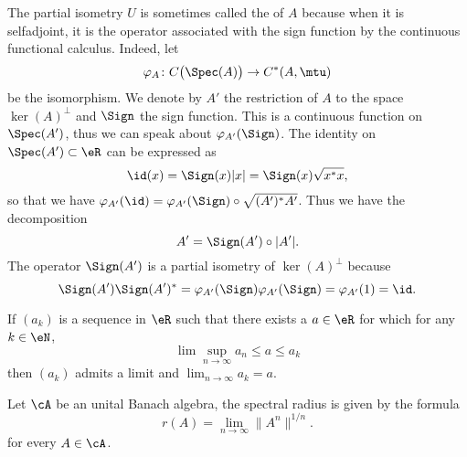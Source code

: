 The partial isometry $U$ is sometimes called the  of $A$ because when it is selfadjoint, it is the operator associated with the sign function by the continuous functional calculus. Indeed, let 
\begin{equation}
	\varphi_A\colon C\big( \Spec(A) \big)\to C^*(A,\mtu)
\end{equation}
be the isomorphism. We denote by $A'$ the restriction of $A$ to the space $\ker(A)^{\perp}$ and $\Sign$ the sign function. This is a continuous function on $\Spec(A')$, thus we can speak about $\varphi_{A'}(\Sign)$. The identity on $\Spec(A')\subset\eR$ can be expressed as
\begin{equation}
	\id(x)=\Sign(x)| x |=\Sign(x)\sqrt{x^*x},
\end{equation}
so that we have $\varphi_{A'}(\id)=\varphi_{A'}(\Sign)\circ \sqrt{(A')^*A'}$. Thus we have the decomposition
\begin{equation}		\label{EqPolarSSKerSign}
	A'=\Sign(A')\circ| A' |.
\end{equation}
The operator $\Sign(A')$ is a partial isometry of $\ker(A)^{\perp}$ because 
\begin{equation}
	\Sign(A')\Sign(A')^*=\varphi_{A'}(\Sign)\varphi_{A'}(\Sign)=\varphi_{A'}(1)=\id.
\end{equation}

\begin{proposition}			\label{prop:cv_lim_sup}
If $(a_k)$ is a sequence in $\eR$ such that there exists a $a\in\eR$ for which for any $k\in\eN$,
\[
\lim\sup_{n\to\infty}a_n\leq a\leq a_k
\]
then $(a_k)$ admits a limit and $\lim_{n\to\infty}a_k=a$.
\end{proposition}

\begin{proposition}
Let $\cA$ be an unital Banach algebra, the spectral radius is given by the formula 
\begin{equation}
   r(A)=\lim_{n\to\infty}\| A^n \|^{1/n}.
\end{equation} \label{prop:An_usn} 
for every $A\in\cA$.
\end{proposition}

